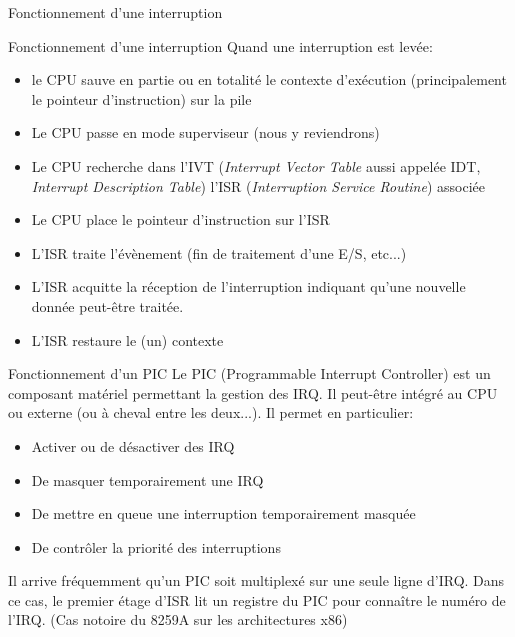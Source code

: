 \begin{frame}{Fonctionnement d'une interruption}
  \begin{center}
  \end{center}
\end{frame}

\begin{frame}{Fonctionnement d'une interruption}
  Quand une  interruption est levée:
  \begin{itemize}
  \item le CPU sauve en  partie ou en totalité le contexte d'exécution
    (principalement le pointeur d'instruction) sur la pile
  \item Le CPU passe en mode superviseur (nous y reviendrons)
  \item  Le CPU  recherche dans  l'IVT (\emph{Interrupt  Vector Table}
    aussi  appelée  IDT,  \emph{Interrupt  Description  Table})  l'ISR
    (\emph{Interruption Service Routine}) associée
  \item Le CPU place le pointeur d'instruction sur l'ISR
  \item L'ISR traite l'évènement (fin de traitement d'une E/S, etc...)
  \item L'ISR acquitte la réception de l'interruption indiquant qu'une
    nouvelle donnée peut-être traitée.
  \item L'ISR restaure le (un) contexte
  \end{itemize}
\end{frame}

\begin{frame}{Fonctionnement d'un PIC}
  Le PIC (Programmable Interrupt Controller) est un composant matériel
  permettant  la gestion  des IRQ.   Il  peut-être intégré  au CPU  ou
  externe (ou à cheval entre les deux...). Il permet en particulier:
  \begin{itemize}
  \item Activer ou de désactiver des IRQ
  \item De masquer temporairement une IRQ
  \item De mettre en queue une interruption temporairement masquée
  \item De contrôler la priorité des interruptions
  \end{itemize}
  Il arrive fréquemment qu'un PIC  soit multiplexé sur une seule ligne
  d'IRQ. Dans  ce cas, le premier  étage d'ISR lit un  registre du PIC
  pour connaître  le numéro de l'IRQ.   (Cas notoire du  8259A sur les
  architectures x86)

\end{frame}

